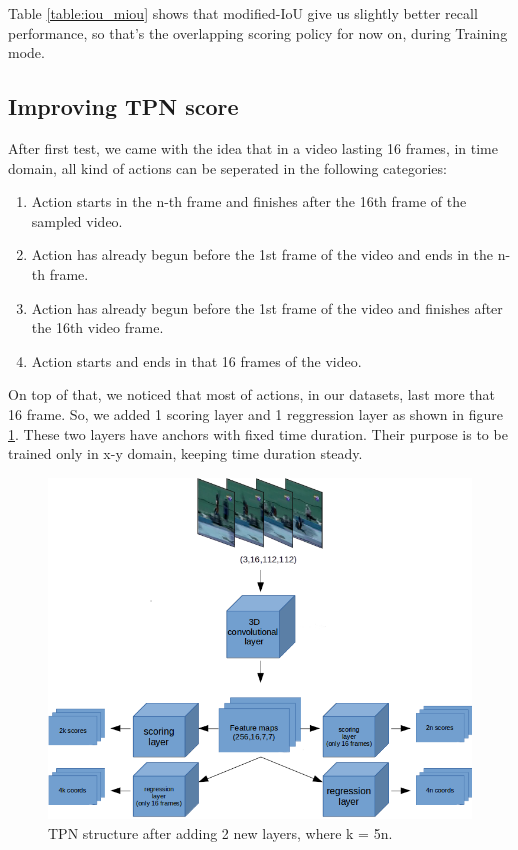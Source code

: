 \documentclass{report}
\begin{document}
Table \ref{table:iou_miou} shows that modified-IoU give us slightly better recall performance, so that's the overlapping scoring policy
for now on, during Training mode.

\subsection{Improving TPN score}
After first test, we came with the idea that in a video lasting 16 frames, in time domain, all kind of actions can be seperated in the following categories:
\begin{enumerate}
\item Action starts in the n-th  frame and finishes after the 16th frame of the sampled video.
\item Action has already begun before the 1st frame of the video and ends in the n-th frame.
\item Action has already begun before the 1st frame of the video and finishes after the 16th video frame.
\item Action starts and ends in that 16 frames of the video.
\end{enumerate}

On top of that, we noticed that most of actions, in our datasets, last more that 16 frame. So, we added 1 scoring layer and 1 reggression layer as shown in 
figure \ref{fig:tpn_1_2}. These two layers have anchors with fixed time duration. Their purpose is to be trained only in x-y domain, keeping time duration
steady. 
\begin{figure}[h]
  \centering
  \includegraphics[scale=0.5]{tpn_1_2}
  \caption{TPN structure after adding 2 new layers, where k = 5n.}
  \label{fig:tpn_1_2}
\end{figure}
\end{document}
